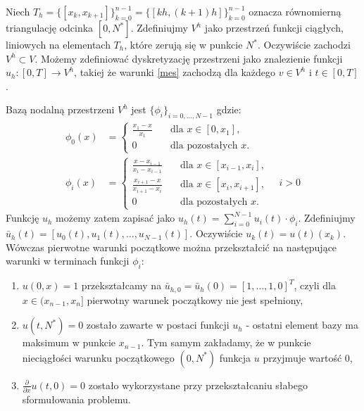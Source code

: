 \documentclass{article}
\begin{document}
Niech $T_{h}=\{[x_{k},x_{k+1}]\}_{k=0}^{n-1} = \{[kh,(k+1)h]\}_{k=0}^{n-1}$ oznacza równomierną triangulację odcinka $[0,N^{*}]$. Zdefiniujmy $V^h$ jako przestrzeń funkcji ciągłych, liniowych na elementach $T_{h}$, które zerują się w punkcie $N^{*}$. Oczywiście zachodzi $V^{h} \subset V$. Możemy zdefiniować dyskretyzację przestrzeni jako znalezienie funkcji $u_{h} : [0,T] \to V^{h}$, takiej że warunki \eqref{mes} zachodzą dla każdego $v \in V^{h}$ i $t \in [0,T]$.

Bazą nodalną przestrzeni $V^{h}$ jest $\{\phi_i\}_{i = 0, \dots, N-1}$ gdzie:
\begin{align*}
\phi_{0} (x) &= \begin{cases}
\frac{x_1 - x}{x_1} \quad &\text{dla } x \in [0, x_1], \\
0 \quad &\text{dla pozostałych } x.
\end{cases} \\
\phi_i (x) &= \begin{cases}
\frac{x - x_{i-1}}{x_i - x_{i-1}} \quad &\text{dla } x \in [x_{i-1}, x_i], \\
\frac{x_{i+1} - x}{x_{i+1} - x_{i}} \quad &\text{dla } x \in [x_{i}, x_{i+1}], \\
0 \quad &\text{dla pozostałych } x.
\end{cases} \quad i > 0
\end{align*}
Funkcję $u_{h}$ możemy zatem zapisać jako $u_h(t) = \sum_{i = 0}^{N-1} u_i (t) \cdot \phi_{i}$. Zdefiniujmy $\bar{u}_h (t) = [u_0 (t), u_1 (t), \dots, u_{N-1} (t) ]$. Oczywiście $u_k (t) = u(t)(x_k)$. Wówczas pierwotne warunki początkowe można przekształcić na następujące warunki w terminach funkcji $\phi_i$:
\begin{enumerate}
	\item $u(0,x) = 1$ przekształcamy na $\bar{u}_{h,0} = \bar{u}_{h}(0) =[1,\dots,1,0]^T$, czyli dla $x \in (x_{n-1}, x_{n}]$ pierwotny warunek początkowy nie jest spełniony,
	\item $u(t,N^{*}) = 0$ zostało zawarte w postaci funkcji $u_h$ - ostatni element bazy ma maksimum w punkcie $x_{n-1}$. Tym samym zakładamy, że w punkcie nieciągłości warunku początkowego $(0,N^{*})$ funkcja $u$ przyjmuje wartość 0,
	\item $\frac{\partial}{\partial x} u(t, 0) = 0$ zostało wykorzystane przy przekształcaniu słabego sformułowania problemu.
\end{enumerate}
\end{document}
